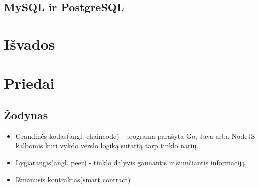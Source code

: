 \documentclass{VUMIFPSkursinis}
\begin{document}
			

	\subsection{MySQL ir PostgreSQL}

\section{Išvados}

\section{Priedai}
\subsection{Žodynas}
\begin{itemize}
	\item{Grandinės kodas(angl. chaincode) - programa parašyta Go, Java arba NodeJS kalbomis kuri vykdo
 verslo logiką sutartą tarp tinklo narių.}
	\item{Lygiarangis(angl. peer) - tinklo dalyvis gaunantis ir siunčiantis informaciją.}
	\item{Išmanusis kontraktas(smart contract)}
\end{itemize}


\printbibliography[heading=bibintoc]  
\end{document}
